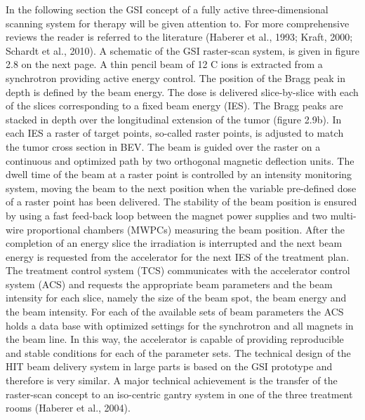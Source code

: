 \documentclass[type=dr, dr=rernat, accentcolor=tud7b,colorbacktitle, bigchapter, openright, twoside, 12pt ]{tudthesis}
\begin{document}
In the following section the GSI concept of a fully active three-dimensional scanning system
for therapy will be given attention to. For more comprehensive reviews the reader is referred
to the literature (Haberer et al., 1993; Kraft, 2000; Schardt et al., 2010). A schematic of the
GSI raster-scan system, is given in figure 2.8 on the next page. A thin pencil beam of 12 C ions is
extracted from a synchrotron providing active energy control. The position of the Bragg peak in
depth is defined by the beam energy. The dose is delivered slice-by-slice with each of the slices
corresponding to a fixed beam energy (IES). The Bragg peaks are stacked in depth over the
longitudinal extension of the tumor (figure 2.9b). In each IES a raster of target points, so-called
raster points, is adjusted to match the tumor cross section in BEV. The beam is guided over the
raster on a continuous and optimized path by two orthogonal magnetic deflection units. The
dwell time of the beam at a raster point is controlled by an intensity monitoring system, moving
the beam to the next position when the variable pre-defined dose of a raster point has been
delivered. The stability of the beam position is ensured by using a fast feed-back loop between
the magnet power supplies and two multi-wire proportional chambers (MWPCs) measuring the
beam position. After the completion of an energy slice the irradiation is interrupted and the
next beam energy is requested from the accelerator for the next IES of the treatment plan. The
treatment control system (TCS) communicates with the accelerator control system (ACS) and
requests the appropriate beam parameters and the beam intensity for each slice, namely the
size of the beam spot, the beam energy and the beam intensity. For each of the available sets
of beam parameters the ACS holds a data base with optimized settings for the synchrotron and
all magnets in the beam line. In this way, the accelerator is capable of providing reproducible
and stable conditions for each of the parameter sets. The technical design of the HIT beam
delivery system in large parts is based on the GSI prototype and therefore is very similar. A
major technical achievement is the transfer of the raster-scan concept to an iso-centric gantry
system in one of the three treatment rooms (Haberer et al., 2004).

\newpage

\vspace*{0.6cm}
\end{document}
